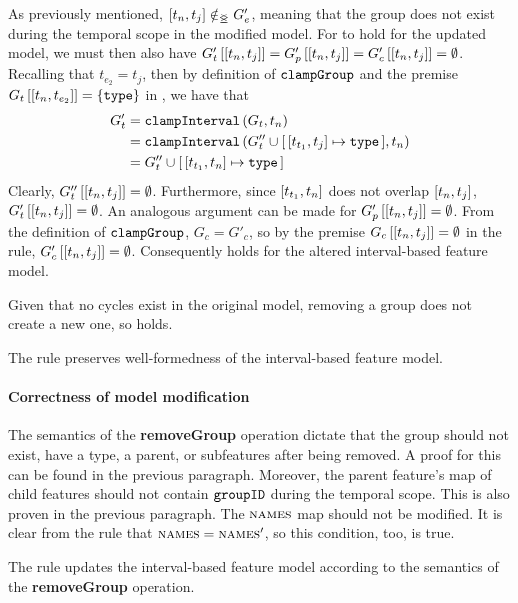    As previously mentioned, $\interval{t_n}{t_j} \notinnr G'_e$, meaning that the group does not exist during the temporal scope in the modified model. For  to hold for the updated model, we must then also have $\lookup{G'_t}{\interval{t_n}{t_j}} = \lookup{G'_p}{\interval{t_n}{t_j}} = \lookup{G'_c}{\interval{t_n}{t_j}} = \emptyset$. Recalling that $t_{e_2} = t_j$, then by definition of $\texttt{clampGroup}$ and the premise $\lookup{G_t}{\interval{t_n}{t_{e_2}}} = \set{\var{type}}$ in , we have that
\begin{align*}
   G'_t &= \var{clampInterval}\left(G_t, t_n\right) \\
        &= \var{clampInterval}\left(G''_t \cup \intervalmapping{t_{t_1}}{t_j}{\var{type}}, t_n\right) \\
        &= G''_t \cup \intervalmapping{t_{t_1}}{t_n}{\var{type}}
\end{align*}
Clearly, $\lookup{G''_t}{\interval{t_n}{t_j}} = \emptyset$.  Furthermore, since $\interval{t_{t_1}}{t_n}$ does not overlap $\interval{t_n}{t_j}$, $\lookup{G'_t}{\interval{t_n}{t_j}} = \emptyset$. An analogous argument can be made for $\lookup{G'_p}{\interval{t_n}{t_j}} = \emptyset$. From the definition of $\texttt{clampGroup}$, $G_c = G'_c$, so by the premise $\lookup{G_c}{\interval{t_n}{t_j}} = \emptyset$ in the rule, $\lookup{G_c'}{\interval{t_n}{t_j}} = \emptyset$. Consequently  holds for the altered interval-based feature model.

Given that no cycles exist in the original model, removing a group does not create a new one, so  holds.
\\

\begin{lemma}
   The  rule preserves well-formedness of the interval-based feature model.
   \label{lemma:remove-group-well-formed}
\end{lemma}

\paragraph{Correctness of model modification}
The semantics of the \textbf{removeGroup} operation dictate that the group should not exist, have a type, a parent, or subfeatures after being removed. A proof for this can be found in the previous paragraph. Moreover, the parent feature's map of child features should not contain $\texttt{groupID}$ during the temporal scope. This is also proven in the previous paragraph. The $\textsc{names}{}$ map should not be modified. It is clear from the rule that $\textsc{names}{} = \textsc{names}{}'$, so this condition, too, is true.
\\

\begin{lemma}
   The  rule updates the interval-based feature model according to the semantics of the \textbf{removeGroup} operation.
   \label{lemma:remove-group-mod}
\end{lemma}
